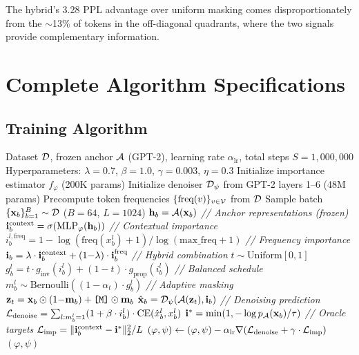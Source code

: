 The hybrid's 3.28 PPL advantage over uniform masking comes disproportionately from the $\sim$13\% of tokens in the off-diagonal quadrants, where the two signals provide complementary information.

\section{Complete Algorithm Specifications}
\label{app:algorithms}

\subsection{Training Algorithm}

\begin{algorithm}[H]
\caption{ATAT Training Procedure}
\label{alg:atat-train}
\begin{algorithmic}[1]
\REQUIRE Dataset $\mathcal{D}$, frozen anchor $\mathcal{A}$ (GPT-2), learning rate $\alpha_{\text{lr}}$, total steps $S = 1{,}000{,}000$
\REQUIRE Hyperparameters: $\lambda=0.7$, $\beta=1.0$, $\gamma=0.003$, $\eta=0.3$
\STATE Initialize importance estimator $f_\varphi$ (200K params)
\STATE Initialize denoiser $\mathcal{D}_\psi$ from GPT-2 layers 1--6 (48M params)
\STATE Precompute token frequencies $\{\text{freq}(v)\}_{v \in \mathcal{V}}$ from $\mathcal{D}$
    \STATE Sample batch $\{\mathbf{x}_b\}_{b=1}^{B} \sim \mathcal{D}$ \hfill ($B = 64$, $L = 1024$)
    \STATE $\mathbf{h}_b = \mathcal{A}(\mathbf{x}_b)$ \hfill \textit{// Anchor representations (frozen)}
    \STATE $\mathbf{i}^{\text{context}}_b = \sigma(\text{MLP}_\varphi(\mathbf{h}_b))$ \hfill \textit{// Contextual importance}
    \STATE $i^{l,\text{freq}}_b = 1 - \log(\text{freq}(x^l_b){+}1)/\log(\text{max\_freq}{+}1)$ \hfill \textit{// Frequency importance}
    \STATE $\mathbf{i}_b = \lambda \cdot \mathbf{i}^{\text{context}}_b + (1{-}\lambda) \cdot \mathbf{i}^{\text{freq}}_b$ \hfill \textit{// Hybrid combination}
    \STATE $t \sim \text{Uniform}[0, 1]$
    \STATE $g^l_b = t \cdot g_{\text{inv}}(i^l_b) + (1{-}t) \cdot g_{\text{prop}}(i^l_b)$ \hfill \textit{// Balanced schedule}
    \STATE $m^l_b \sim \text{Bernoulli}((1{-}\alpha_t) \cdot g^l_b)$ \hfill \textit{// Adaptive masking}
    \STATE $\mathbf{z}_t = \mathbf{x}_b \odot (1{-}\mathbf{m}_b) + \texttt{[M]} \odot \mathbf{m}_b$
    \STATE $\hat{\mathbf{x}}_b = \mathcal{D}_\psi(\mathcal{A}(\mathbf{z}_t), \mathbf{i}_b)$ \hfill \textit{// Denoising prediction}
    \STATE $\mathcal{L}_{\text{denoise}} = \sum_{l: m^l_b=1} (1 + \beta \cdot i^l_b) \cdot \text{CE}(\hat{x}^l_b, x^l_b)$
    \STATE $\mathbf{i}^* = \min(1, -\log p_{\mathcal{A}}(\mathbf{x}_b)/\tau)$ \hfill \textit{// Oracle targets}
    \STATE $\mathcal{L}_{\text{imp}} = \|\mathbf{i}^{\text{context}}_b - \mathbf{i}^*\|_2^2 / L$
    \STATE $(\varphi, \psi) \leftarrow (\varphi, \psi) - \alpha_{\text{lr}} \nabla(\mathcal{L}_{\text{denoise}} + \gamma \cdot \mathcal{L}_{\text{imp}})$
\ENDFOR
\RETURN $(\varphi, \psi)$
\end{algorithmic}
\end{algorithm}

